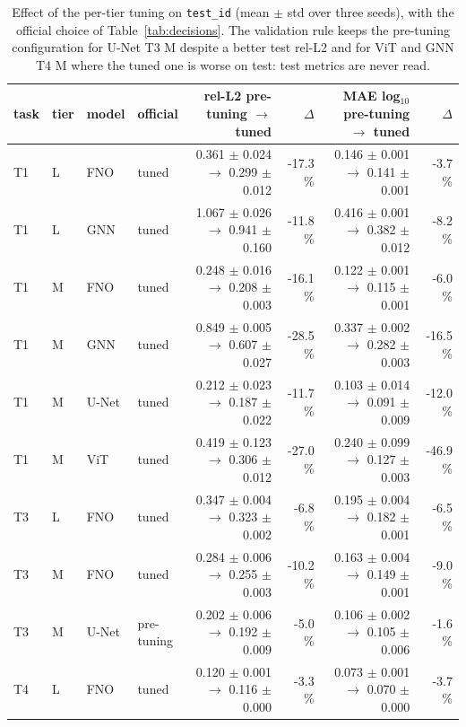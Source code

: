 \begin{table}[tb]
\centering
\scriptsize
\setlength{\tabcolsep}{3.5pt}
\caption{Effect of the per-tier tuning on \texttt{test\_id} (mean $\pm$ std over three seeds), with the official choice of Table~\ref{tab:decisions}. The validation rule keeps the pre-tuning configuration for U-Net T3 M despite a better test rel-L2 and for ViT and GNN T4 M where the tuned one is worse on test: test metrics are never read.}
\label{tab:tuning_effect}
\setlength{\tabcolsep}{2.2pt}
\begin{tabular}{llllrrrr}
\toprule
task & tier & model & official & rel-L2 pre-tuning $\rightarrow$ tuned & $\Delta$ & MAE log$_{10}$ pre-tuning $\rightarrow$ tuned & $\Delta$ \\
\midrule
T1 & L & FNO & tuned & 0.361 $\pm$ 0.024 $\rightarrow$ 0.299 $\pm$ 0.012 & -17.3 \% & 0.146 $\pm$ 0.001 $\rightarrow$ 0.141 $\pm$ 0.001 & -3.7 \% \\
T1 & L & GNN & tuned & 1.067 $\pm$ 0.026 $\rightarrow$ 0.941 $\pm$ 0.160 & -11.8 \% & 0.416 $\pm$ 0.001 $\rightarrow$ 0.382 $\pm$ 0.012 & -8.2 \% \\
T1 & M & FNO & tuned & 0.248 $\pm$ 0.016 $\rightarrow$ 0.208 $\pm$ 0.003 & -16.1 \% & 0.122 $\pm$ 0.001 $\rightarrow$ 0.115 $\pm$ 0.001 & -6.0 \% \\
T1 & M & GNN & tuned & 0.849 $\pm$ 0.005 $\rightarrow$ 0.607 $\pm$ 0.027 & -28.5 \% & 0.337 $\pm$ 0.002 $\rightarrow$ 0.282 $\pm$ 0.003 & -16.5 \% \\
T1 & M & U-Net & tuned & 0.212 $\pm$ 0.023 $\rightarrow$ 0.187 $\pm$ 0.022 & -11.7 \% & 0.103 $\pm$ 0.014 $\rightarrow$ 0.091 $\pm$ 0.009 & -12.0 \% \\
T1 & M & ViT & tuned & 0.419 $\pm$ 0.123 $\rightarrow$ 0.306 $\pm$ 0.012 & -27.0 \% & 0.240 $\pm$ 0.099 $\rightarrow$ 0.127 $\pm$ 0.003 & -46.9 \% \\
T3 & L & FNO & tuned & 0.347 $\pm$ 0.004 $\rightarrow$ 0.323 $\pm$ 0.002 & -6.8 \% & 0.195 $\pm$ 0.004 $\rightarrow$ 0.182 $\pm$ 0.001 & -6.5 \% \\
T3 & M & FNO & tuned & 0.284 $\pm$ 0.006 $\rightarrow$ 0.255 $\pm$ 0.003 & -10.2 \% & 0.163 $\pm$ 0.004 $\rightarrow$ 0.149 $\pm$ 0.001 & -9.0 \% \\
T3 & M & U-Net & pre-tuning & 0.202 $\pm$ 0.006 $\rightarrow$ 0.192 $\pm$ 0.009 & -5.0 \% & 0.106 $\pm$ 0.002 $\rightarrow$ 0.105 $\pm$ 0.006 & -1.6 \% \\
T4 & L & FNO & tuned & 0.120 $\pm$ 0.001 $\rightarrow$ 0.116 $\pm$ 0.000 & -3.3 \% & 0.073 $\pm$ 0.001 $\rightarrow$ 0.070 $\pm$ 0.000 & -3.7 \% \\

\end{tabular}
\end{table}

